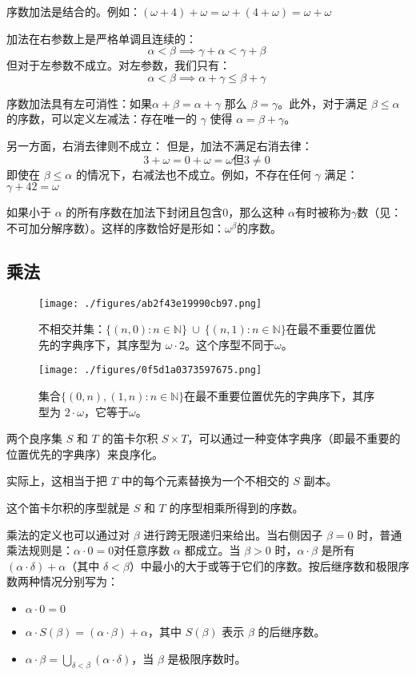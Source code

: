 序数加法是结合的。例如：\((\omega + 4) + \omega = \omega + (4 + \omega) = \omega + \omega\)

加法在右参数上是严格单调且连续的：
\[
\alpha < \beta \implies \gamma + \alpha < \gamma + \beta~
\]
但对于左参数不成立。对左参数，我们只有：
\[
\alpha < \beta \implies \alpha + \gamma \leq \beta + \gamma~
\]

序数加法具有左可消性：如果\(\alpha + \beta = \alpha + \gamma\) 
那么 \(\beta = \gamma\)。此外，对于满足 \(\beta \leq \alpha\) 的序数，可以定义左减法：存在唯一的 \(\gamma\) 使得 \(\alpha = \beta + \gamma\)。  

另一方面，右消去律则不成立：
但是，加法不满足右消去律：
\[3 + \omega = 0 + \omega = \omega \text{但}3 \neq 0~\]
即使在 \(\beta \leq \alpha\) 的情况下，右减法也不成立。例如，不存在任何 \(\gamma\) 满足：\(\gamma + 42 = \omega\)

如果小于 \(\alpha\) 的所有序数在加法下封闭且包含0，那么这种 \(\alpha\)有时被称为\(\gamma\)数（见：不可加分解序数）。这样的序数恰好是形如：\(\omega^\beta\)的序数。
\subsection{乘法}
\begin{figure}[ht]
\centering
\texttt{[image: ./figures/ab2f43e19990cb97.png]}
\caption{不相交并集：\(\{(n,0) : n \in \mathbb{N}\} \ \cup \ \{(n,1) : n \in \mathbb{N}\}\)在最不重要位置优先的字典序下，其序型为 \(\omega \cdot 2\)。这个序型不同于\(\omega\)。} \label{fig_Ordina_1}
\end{figure}
\begin{figure}[ht]
\centering
\texttt{[image: ./figures/0f5d1a0373597675.png]}
\caption{集合\(\{(0,n), (1,n) : n \in \mathbb{N}\}\)在最不重要位置优先的字典序下，其序型为 \(2 \cdot \omega\)，它等于\(\omega\)。} \label{fig_Ordina_2}
\end{figure}
两个良序集 \(S\) 和 \(T\) 的笛卡尔积 \(S \times T\)，可以通过一种变体字典序（即最不重要的位置优先的字典序）来良序化。  

实际上，这相当于把 \(T\) 中的每个元素替换为一个不相交的 \(S\) 副本。  

这个笛卡尔积的序型就是 \(S\) 和 \(T\) 的序型相乘所得到的序数。

乘法的定义也可以通过对 \(\beta\) 进行跨无限递归来给出。当右侧因子 \(\beta = 0\) 时，普通乘法规则是：\(\alpha \cdot 0 = 0\)对任意序数 \(\alpha\) 都成立。当 \(\beta > 0\) 时，\(\alpha \cdot \beta\) 是所有\((\alpha \cdot \delta) + \alpha\)（其中 \(\delta < \beta\)）中最小的大于或等于它们的序数。按后继序数和极限序数两种情况分别写为：
\begin{itemize}
\item \(\alpha \cdot 0 = 0\)
\item \(\alpha \cdot S(\beta) = (\alpha \cdot \beta) + \alpha\)，其中 \(S(\beta)\) 表示 \(\beta\) 的后继序数。
\item \(\alpha \cdot \beta = \bigcup_{\delta < \beta} (\alpha \cdot \delta)\)，当 \(\beta\) 是极限序数时。
\end{itemize}

